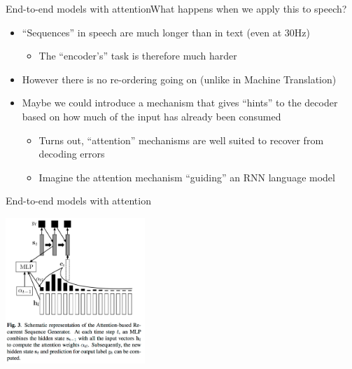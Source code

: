 \begin{frame}{End-to-end models with attention}{What happens when we apply this to speech?}
  \begin{itemize}
  \item ``Sequences'' in speech are much longer than in text (even at 30Hz)
    \begin{itemize}
    \item The ``encoder's'' task is therefore much harder
    \end{itemize}
  \item However there is no re-ordering going on (unlike in Machine Translation)
  \item Maybe we could introduce a mechanism that gives ``hints'' to the decoder based on how much of the input has already been consumed
    \begin{itemize}
    \item Turns out, ``attention'' mechanisms are well suited to recover from decoding errors
    \item Imagine the attention mechanism ``guiding'' an RNN language model
    \end{itemize}
  \end{itemize}
\end{frame}

\begin{frame}{End-to-end models with attention}{\cite{BahdanauCSBB15}}
  \begin{center}
    \includegraphics[height=55mm]{figures/att}
  \end{center}
\end{frame}

